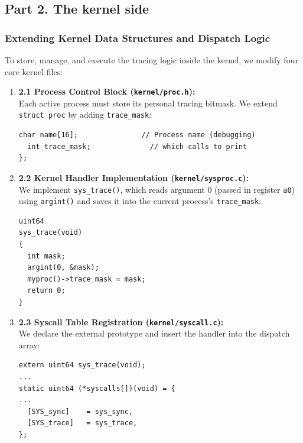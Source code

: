\documentclass{labreport}
\begin{document}
\subsection{Part 2. The kernel side}

\subsubsection{Extending Kernel Data Structures and Dispatch Logic}
To store, manage, and execute the tracing logic inside the kernel, we modify four core kernel files:

\begin{enumerate}[leftmargin=*]
    \item \textbf{2.1 Process Control Block (\texttt{kernel/proc.h}):}\\
    Each active process must store its personal tracing bitmask. We extend \texttt{struct proc} by adding \texttt{trace\_mask}:
\begin{lstlisting}[style=c]
  char name[16];               // Process name (debugging)
  int trace_mask;              // which calls to print
};
\end{lstlisting}

    \item \textbf{2.2 Kernel Handler Implementation (\texttt{kernel/sysproc.c}):}\\
    We implement \texttt{sys\_trace()}, which reads argument 0 (passed in register \texttt{a0}) using \texttt{argint()} and saves it into the current process's \texttt{trace\_mask}:
\begin{lstlisting}[style=c]
uint64
sys_trace(void)
{
  int mask;
  argint(0, &mask);
  myproc()->trace_mask = mask;
  return 0;
}
\end{lstlisting}

    \item \textbf{2.3 Syscall Table Registration (\texttt{kernel/syscall.c}):}\\
    We declare the external prototype and insert the handler into the dispatch array:
\begin{lstlisting}[style=c]
extern uint64 sys_trace(void);
...
static uint64 (*syscalls[])(void) = {
...
  [SYS_sync]    = sys_sync,
  [SYS_trace]   = sys_trace,
};
\end{lstlisting}


\end{enumerate}
\end{document}
